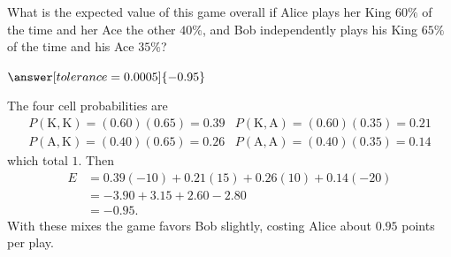\documentclass[12pt]{ximera}
\begin{document}
\begin{problem}
\begin{prompt}
What is the expected value of this game overall if Alice plays her King $60\%$ of the
time and her Ace the other $40\%$, and Bob independently plays his King $65\%$ of the
time and his Ace $35\%$?

$\answer[tolerance=0.0005]{-0.95}$

\begin{feedback}
The four cell probabilities are
\[
\begin{array}{ll}
P(\text{K},\text{K})=(0.60)(0.65)=0.39 & P(\text{K},\text{A})=(0.60)(0.35)=0.21\\
P(\text{A},\text{K})=(0.40)(0.65)=0.26 & P(\text{A},\text{A})=(0.40)(0.35)=0.14
\end{array}
\]
which total $1$. \checkmark Then
\begin{align*}
E &= 0.39(-10) + 0.21(15) + 0.26(10) + 0.14(-20)\\
  &= -3.90 + 3.15 + 2.60 - 2.80\\
  &= -0.95.
\end{align*}
With these mixes the game favors Bob slightly, costing Alice about $0.95$ points per
play.
\end{feedback}
\end{prompt}
\end{problem}
\end{document}
